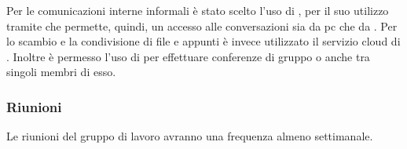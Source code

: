 \documentclass[12pt,a4paper]{article}
\begin{document}
Per le comunicazioni interne informali è stato scelto l'uso di \textit{}, per il suo utilizzo tramite \textit{} che permette, quindi, un accesso alle conversazioni sia da pc che da \textit{}.
Per lo scambio e la condivisione di file e appunti è invece utilizzato il servizio cloud di \textit{}. Inoltre è permesso l'uso di \textit{} per effettuare conferenze di gruppo o anche tra singoli membri di esso.

\subsubsection{Riunioni}
Le riunioni del gruppo di lavoro avranno una frequenza almeno settimanale.
\end{document}
